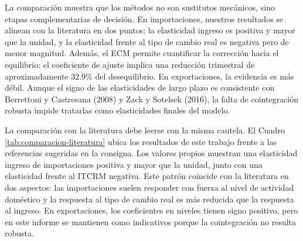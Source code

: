 \documentclass[11pt]{article}
\begin{document}
La comparación muestra que los métodos no son sustitutos mecánicos, sino etapas
complementarias de decisión. En importaciones, nuestros resultados se alinean
con la literatura en dos puntos: la elasticidad ingreso es positiva y mayor que
la unidad, y la elasticidad frente al tipo de cambio real es negativa pero de
menor magnitud. Además, el ECM permite cuantificar la corrección hacia el
equilibrio: el coeficiente de ajuste implica una reducción trimestral de
aproximadamente 32.9\% del desequilibrio. En exportaciones, la evidencia es más
débil. Aunque el signo de las elasticidades de largo plazo es consistente con
Berrettoni y Castresana (2008) y Zack y Sotelsek (2016), la falta de
cointegración robusta impide tratarlas como elasticidades finales del modelo.

La comparación con la literatura debe leerse con la misma cautela. El Cuadro
\ref{tab:comparacion-literatura} ubica los resultados de este trabajo frente a
las referencias sugeridas en la consigna. Los valores propios muestran una
elasticidad ingreso de importaciones positiva y mayor que la unidad, junto con
una elasticidad frente al ITCRM negativa. Este patrón coincide con la literatura
en dos aspectos: las importaciones suelen responder con fuerza al nivel de
actividad doméstico y la respuesta al tipo de cambio real es más reducida que la
respuesta al ingreso. En exportaciones, los coeficientes en niveles tienen signo
positivo, pero en este informe se mantienen como indicativos porque la
cointegración no resulta robusta.
\end{document}
